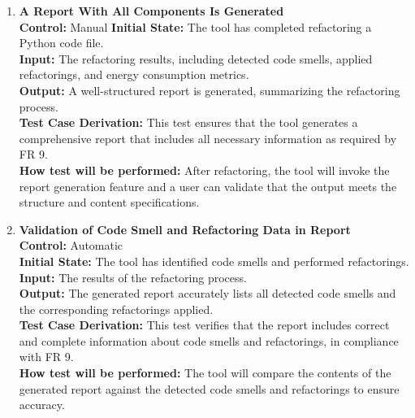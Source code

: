 \documentclass[12pt, titlepage]{article}
\begin{document}
\begin{enumerate}[label={\bf
    \textcolor{Maroon}{test-FR-RP-\arabic*}}, wide=0pt, font=\itshape]
  \item \textbf{A Report With All Components Is Generated}\\[2mm]
    \textbf{Control:} Manual
    \textbf{Initial State:} The tool has completed refactoring a
    Python code file.\\
    \textbf{Input:} The refactoring results, including detected code
    smells, applied refactorings, and energy consumption metrics.\\
    \textbf{Output:} A well-structured report is generated,
    summarizing the refactoring process.\\[2mm]
    \textbf{Test Case Derivation:} This test ensures that the tool
    generates a comprehensive report that includes all necessary
    information as required by FR 9.\\[2mm]
    \textbf{How test will be performed:} After refactoring, the tool
    will invoke the report generation feature and a user can validate
    that the output meets the structure and content specifications.

  \item \textbf{Validation of Code Smell and Refactoring Data in Report}\\[2mm]
    \textbf{Control:} Automatic \\
    \textbf{Initial State:} The tool has identified code smells and
    performed refactorings.\\
    \textbf{Input:} The results of the refactoring process.\\
    \textbf{Output:} The generated report accurately lists all
    detected code smells and the corresponding refactorings applied.\\[2mm]
    \textbf{Test Case Derivation:} This test verifies that the report
    includes correct and complete information about code smells and
    refactorings, in compliance with FR 9.\\[2mm]
    \textbf{How test will be performed:} The tool will compare the
    contents of the generated report against the detected code smells
    and refactorings to ensure accuracy.


\end{enumerate}
\end{document}
